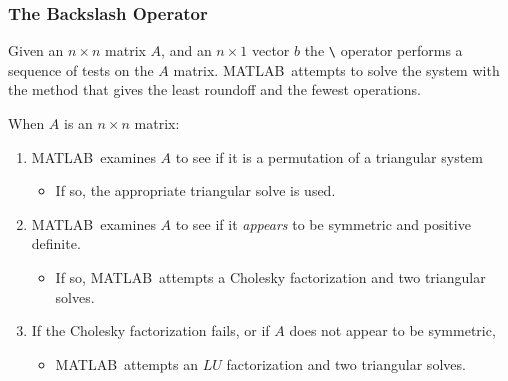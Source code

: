 \documentclass[10pt]{beamer}
\newcommand{\matdim}[2]{\ensuremath{#1\times#2}}
\begin{document}
\begin{frame}[fragile]
\frametitle{The Backslash Operator}

Given an \matdim{n}{n} matrix $A$, and an \matdim{n}{1} vector $b$
the \verb|\| operator performs a sequence of tests on the $A$ matrix.
MATLAB\ attempts to solve the system with the method that gives the
least roundoff and the fewest operations.

When $A$ is an \matdim{n}{n} matrix:
\vspace{0.0cm}
\begin{enumerate}
    \item   MATLAB\ examines $A$ to see if it is a permutation of a triangular system
            \begin{itemize}
                \item[]   If so, the appropriate triangular solve is used.
            \end{itemize}
            \vspace{3ex}

    \item   MATLAB\ examines $A$ to see if it \emph{appears} to be symmetric and positive
            definite.
           \begin{itemize}
                \item[]   If so, MATLAB\ attempts a Cholesky factorization\newline
                          and two triangular solves.
           \end{itemize}
            \vspace{3ex}

    \item   If the Cholesky factorization fails, or if $A$ does not appear to
            be symmetric,
            \begin{itemize}
           \item[] MATLAB\ attempts an $LU$ factorization\newline
                    and two triangular solves.
        \end{itemize}
\end{enumerate}

\end{frame}
\end{document}
